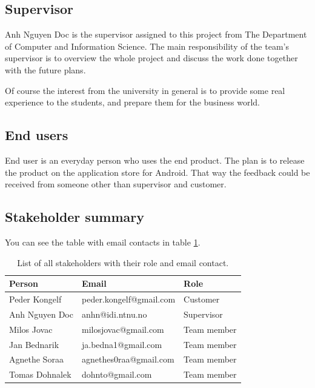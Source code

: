 \subsection{Supervisor}

Anh Nguyen Doc is the supervisor assigned to this project from The Department of Computer and Information Science. 
The main responsibility of the team's supervisor is to overview the whole project and discuss the work done together with the future plans. 

Of course the interest from the university in general is to provide some real experience to the students, and prepare them for the business world.

\subsection{End users}
End user is an everyday person who uses the end product. The plan is to release the product on the application store for Android. That way the feedback could be received from someone other than supervisor and customer. 

\subsection{Stakeholder summary}
You can see the table with email contacts in table \ref{tab:stakeholders_summary}.

\begin{table}[!ht]\centering
\caption{List of all stakeholders with their role and email contact. }
\label{tab:stakeholders_summary}
\def\arraystretch{1.3}
\begin{tabular}{lll}
\toprule[0.5mm]
\textbf{Person} & \textbf{Email} & \textbf{Role}\\
\midrule
Peder Kongelf & peder.kongelf@gmail.com  & Customer\\
\midrule
Anh Nguyen Doc	 & anhn@idi.ntnu.no & Supervisor \\
\midrule
Milos Jovac &  milosjovac@gmail.com & Team member  \\
Jan Bednarik &  ja.bedna1@gmail.com & Team member\\
Agnethe Soraa & agnethes0raa@gmail.com & Team member  \\
Tomas Dohnalek & dohnto@gmail.com & Team member \\
\bottomrule[0.5mm]
\end{tabular}
\end{table}

